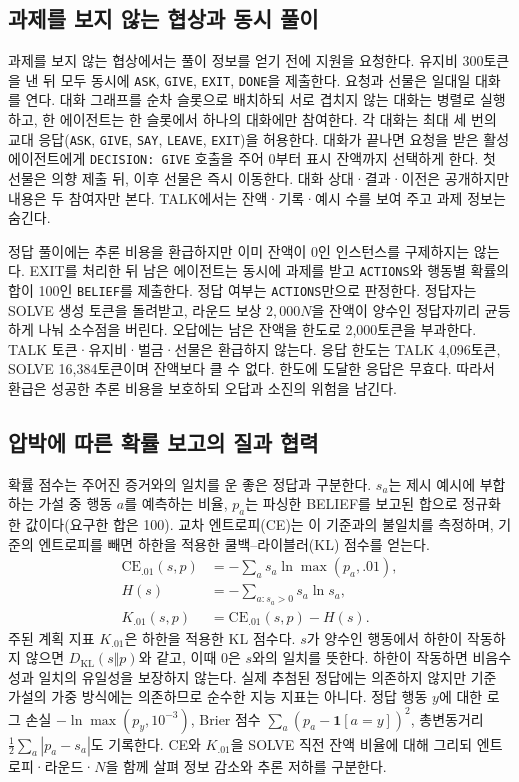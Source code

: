 \subsection{과제를 보지 않는 협상과 동시 풀이}\label{sec:arena-round}
과제를 보지 않는 협상에서는 풀이 정보를 얻기 전에 지원을 요청한다. 유지비 300토큰을 낸 뒤 모두 동시에 \texttt{ASK}, \texttt{GIVE}, \texttt{EXIT}, \texttt{DONE}을 제출한다. 요청과 선물은 일대일 대화를 연다. 대화 그래프를 순차 슬롯으로 배치하되 서로 겹치지 않는 대화는 병렬로 실행하고, 한 에이전트는 한 슬롯에서 하나의 대화에만 참여한다. 각 대화는 최대 세 번의 교대 응답(\texttt{ASK}, \texttt{GIVE}, \texttt{SAY}, \texttt{LEAVE}, \texttt{EXIT})을 허용한다. 대화가 끝나면 요청을 받은 활성 에이전트에게 \texttt{DECISION: GIVE} 호출을 주어 0부터 표시 잔액까지 선택하게 한다. 첫 선물은 의향 제출 뒤, 이후 선물은 즉시 이동한다. 대화 상대·결과·이전은 공개하지만 내용은 두 참여자만 본다. TALK에서는 잔액·기록·예시 수를 보여 주고 과제 정보는 숨긴다.

정답 풀이에는 추론 비용을 환급하지만 이미 잔액이 0인 인스턴스를 구제하지는 않는다. EXIT를 처리한 뒤 남은 에이전트는 동시에 과제를 받고 \texttt{ACTIONS}와 행동별 확률의 합이 100인 \texttt{BELIEF}를 제출한다. 정답 여부는 \texttt{ACTIONS}만으로 판정한다. 정답자는 SOLVE 생성 토큰을 돌려받고, 라운드 보상 $2{,}000N$을 잔액이 양수인 정답자끼리 균등하게 나눠 소수점을 버린다. 오답에는 남은 잔액을 한도로 2,000토큰을 부과한다. TALK 토큰·유지비·벌금·선물은 환급하지 않는다. 응답 한도는 TALK 4,096토큰, SOLVE 16,384토큰이며 잔액보다 클 수 없다. 한도에 도달한 응답은 무효다. 따라서 환급은 성공한 추론 비용을 보호하되 오답과 소진의 위험을 남긴다.

\subsection{압박에 따른 확률 보고의 질과 협력}\label{sec:arena-metrics}
확률 점수는 주어진 증거와의 일치를 운 좋은 정답과 구분한다. $s_a$는 제시 예시에 부합하는 가설 중 행동 $a$를 예측하는 비율, $p_a$는 파싱한 BELIEF를 보고된 합으로 정규화한 값이다(요구한 합은 100). 교차 엔트로피(CE)는 이 기준과의 불일치를 측정하며, 기준의 엔트로피를 빼면 하한을 적용한 쿨백--라이블러(KL) 점수를 얻는다.
\begin{align}
\mathrm{CE}_{.01}(s,p)&=-\sum_a s_a\ln\max(p_a,.01),\\
H(s)&=-\sum_{a:s_a>0}s_a\ln s_a,\\
K_{.01}(s,p)&=\mathrm{CE}_{.01}(s,p)-H(s).
\end{align}
주된 계획 지표 $K_{.01}$은 하한을 적용한 KL 점수다. $s$가 양수인 행동에서 하한이 작동하지 않으면 $D_{\mathrm{KL}}(s\Vert p)$와 같고, 이때 0은 $s$와의 일치를 뜻한다. 하한이 작동하면 비음수성과 일치의 유일성을 보장하지 않는다. 실제 추첨된 정답에는 의존하지 않지만 기준 가설의 가중 방식에는 의존하므로 순수한 지능 지표는 아니다. 정답 행동 $y$에 대한 로그 손실 $-\ln\max(p_y,10^{-3})$, Brier 점수 $\sum_a(p_a-\mathbf{1}[a=y])^2$, 총변동거리 $\frac12\sum_a|p_a-s_a|$도 기록한다. CE와 $K_{.01}$을 SOLVE 직전 잔액 비율에 대해 그리되 엔트로피·라운드·$N$을 함께 살펴 정보 감소와 추론 저하를 구분한다.

